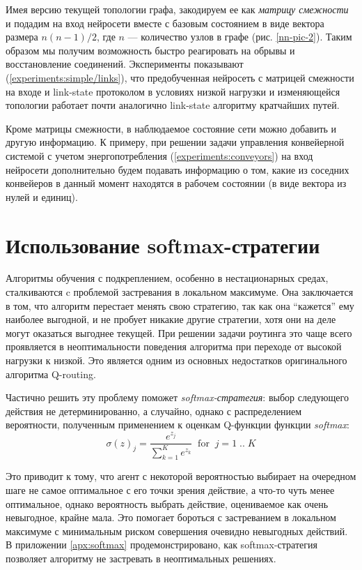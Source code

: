 \documentclass[specification, annotation]{itmo-student-thesis}
\begin{document}
Имея версию текущей топологии графа, закодируем ее как \textit{матрицу
  смежности} и подадим на вход нейросети вместе с базовым состоянием в виде
вектора размера $n(n-1)/2$, где $n$ --- количество узлов в графе (рис.
\ref{nn-pic-2}). Таким образом мы получим возможность быстро реагировать на
обрывы и восстановление соединений. Эксперименты показывают
(\ref{experiments:simple/links}), что предобученная нейросеть с матрицей
смежности на входе и link-state протоколом в условиях низкой нагрузки и
изменяющейся топологии работает почти аналогично link-state алгоритму кратчайших
путей.

Кроме матрицы смежности, в наблюдаемое состояние сети можно добавить и другую
информацию. К примеру, при решении задачи управления конвейерной системой с
учетом энергопотребления (\ref{experiments:conveyors}) на вход нейросети
дополнительно будем подавать информацию о том, какие из соседних конвейеров в
данный момент находятся в рабочем состоянии (в виде вектора из нулей и единиц).

\section{Использование softmax-стратегии}\label{algo:softmax}

Алгоритмы обучения с подкреплением, особенно в нестационарных средах,
сталкиваются c проблемой застревания в локальном максимуме. Она заключается в
том, что алгоритм перестает менять свою стратегию, так как она \enquote{кажется} ему
наиболее выгодной, и не пробует никакие другие стратегии, хотя они на деле могут
оказаться выгоднее текущей. При решении задачи роутинга это чаще всего
проявляется в неоптимальности поведения алгоритма при переходе от высокой
нагрузки к низкой. Это является одним из основных недостатков оригинального
алгоритма Q-routing.

Частично решить эту проблему поможет \textit{softmax-стратегия}: выбор
следующего действия не детерминированно, а случайно, однако с распределением
вероятности, полученным применением к оценкам Q-функции функции
\textit{softmax}:
\[
\sigma(z)_j = \frac{e^{z_j}}{\sum_{k=1}^K {e^{z_k}}} \; \; \mathrm{for} \; \; j
= 1 \; .. \; K
\]

Это приводит к тому, что агент с некоторой вероятностью выбирает на очередном
шаге не самое оптимальное с его точки зрения действие, а что-то чуть менее
оптимальное, однако вероятность выбрать действие, оцениваемое как очень
невыгодное, крайне мала. Это помогает бороться с застреванием в локальном
максимуме с минимальным риском совершения очевидно невыгодных действий. В
приложении \ref{apx:softmax} продемонстрировано, как softmax-стратегия позволяет
алгоритму не застревать в неоптимальных решениях.
\end{document}
